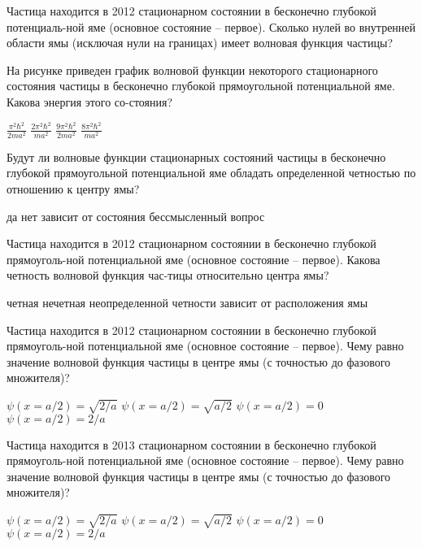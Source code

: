 \documentclass[11pt,a4paper]{exam}
\begin{document}
\begin{questions}
\question Частица находится в 2012 стационарном состоянии в бесконечно глубокой потенциаль-ной яме (основное состояние – первое). Сколько нулей во внутренней области ямы (исключая нули на границах) имеет волновая функция частицы?
\begin{choices}
\end{choices}

\question На рисунке приведен график волновой функции некоторого стационарного состояния частицы в бесконечно глубокой прямоугольной потенциальной яме. Какова энергия этого со-стояния?
\begin{choices}
\choice $\frac{{{\pi ^2}{\hbar ^2}}}{{2m{a^2}}}$  
\choice $\frac{{2{\pi ^2}{\hbar ^2}}}{{m{a^2}}}$  
\choice $\frac{{9{\pi ^2}{\hbar ^2}}}{{2m{a^2}}}$ 
\choice $\frac{{8{\pi ^2}{\hbar ^2}}}{{m{a^2}}}$
\end{choices}

\question Будут ли волновые функции стационарных состояний частицы в бесконечно глубокой прямоугольной потенциальной яме обладать определенной четностью по отношению к центру ямы?
\begin{choices}
\choice да    
\choice нет         
\choice зависит от состояния    
\choice бессмысленный вопрос
\end{choices}

\question Частица находится в 2012 стационарном состоянии в бесконечно глубокой прямоуголь-ной потенциальной яме (основное состояние – первое). Какова четность волновой функция час-тицы относительно центра ямы?
\begin{choices}
\choice четная            
\choice нечетная
\choice неопределенной четности 
\choice зависит от расположения ямы
\end{choices}

\question Частица находится в 2012 стационарном состоянии в бесконечно глубокой прямоуголь-ной потенциальной яме (основное состояние – первое). Чему равно значение волновой функция частицы в центре ямы (с точностью до фазового множителя)?
\begin{choices}
\choice $\psi (x = a/2) = \sqrt {2/a} $        
\choice $\psi (x = a/2) = \sqrt {a/2} $
\choice $\psi (x = a/2) = 0$          
\choice $\psi (x = a/2) = 2/a$ 
\end{choices}

\question Частица находится в 2013 стационарном состоянии в бесконечно глубокой прямоуголь-ной потенциальной яме (основное состояние – первое). Чему равно значение волновой функция частицы в центре ямы (с точностью до фазового множителя)?
\begin{choices}
\choice $\psi (x = a/2) = \sqrt {2/a} $        
\choice $\psi (x = a/2) = \sqrt {a/2} $
\choice $\psi (x = a/2) = 0$          
\choice $\psi (x = a/2) = 2/a$ 
\end{choices}


\end{questions}
\end{document}
